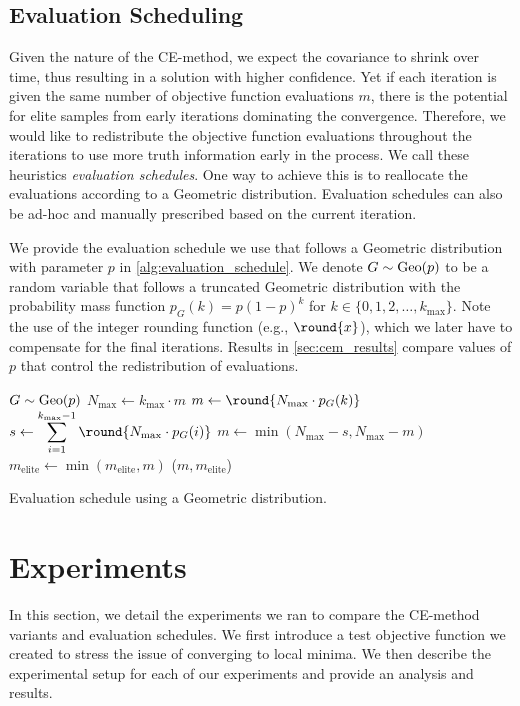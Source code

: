 \subsection{Evaluation Scheduling} \label{sec:cem_alg_eval_schedule}
Given the nature of the CE-method, we expect the covariance to shrink over time, thus resulting in a solution with higher confidence.
Yet if each iteration is given the same number of objective function evaluations $m$, there is the potential for elite samples from early iterations dominating the convergence.
Therefore, we would like to redistribute the objective function evaluations throughout the iterations to use more truth information early in the process.
We call these heuristics \textit{evaluation schedules}.
One way to achieve this is to reallocate the evaluations according to a Geometric distribution.
Evaluation schedules can also be ad-hoc and manually prescribed based on the current iteration.

We provide the evaluation schedule we use that follows a Geometric distribution with parameter $p$ in \cref{alg:evaluation_schedule}.
We denote $G \sim \operatorname{Geo}(p)$ to be a random variable that follows a truncated Geometric distribution with the probability mass function $p_G(k) = p(1 - p)^k$ for $k \in \{0, 1, 2, \ldots, k_\text{max}\}$. %
Note the use of the integer rounding function (e.g., $\round{x}$), which we later have to compensate for the final iterations.
Results in \cref{sec:cem_results} compare values of $p$ that control the redistribution of evaluations.


\begin{algorithm}[ht]
  \begin{algorithmic}
    \State $G \sim \operatorname{Geo}(p)$
    \State $N_\text{max} \leftarrow k_\text{max} \cdot m$
    \State $m \leftarrow \round{N_\text{max} \cdot p_G(k)}$
        \State $s \leftarrow \displaystyle\sum_{i=1}^{k_\text{max}-1} \round{N_\text{max} \cdot p_G(i)}$
        \State $m \leftarrow \min(N_\text{max} - s, N_\text{max} - m)$
    \EndIf
    \State $m_\text{elite} \leftarrow \min(m_\text{elite}, m)$
    \State \Return ($m, m_\text{elite}$) 
  \EndFunction
  \end{algorithmic}
  \caption{\label{alg:evaluation_schedule} Evaluation schedule using a Geometric distribution.}
\end{algorithm}


\section{Experiments} \label{sec:cem_experiments}
In this section, we detail the experiments we ran to compare the CE-method variants and evaluation schedules.
We first introduce a test objective function we created to stress the issue of converging to local minima. 
We then describe the experimental setup for each of our experiments and provide an analysis and results.


